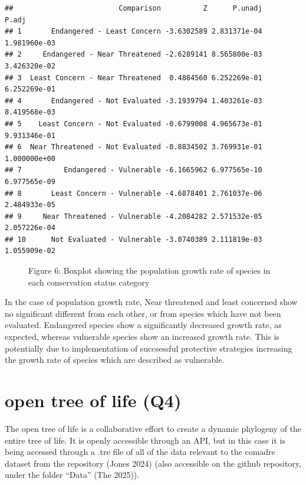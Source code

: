 \documentclass[
]{article}
\begin{document}
\begin{verbatim}
##                         Comparison          Z      P.unadj        P.adj
## 1       Endangered - Least Concern -3.6302589 2.831371e-04 1.981960e-03
## 2     Endangered - Near Threatened -2.6289141 8.565800e-03 3.426320e-02
## 3  Least Concern - Near Threatened  0.4884560 6.252269e-01 6.252269e-01
## 4       Endangered - Not Evaluated -3.1939794 1.403261e-03 8.419568e-03
## 5    Least Concern - Not Evaluated -0.6799008 4.965673e-01 9.931346e-01
## 6  Near Threatened - Not Evaluated -0.8834502 3.769931e-01 1.000000e+00
## 7          Endangered - Vulnerable -6.1665962 6.977565e-10 6.977565e-09
## 8       Least Concern - Vulnerable -4.6878401 2.761037e-06 2.484933e-05
## 9     Near Threatened - Vulnerable -4.2084282 2.571532e-05 2.057226e-04
## 10      Not Evaluated - Vulnerable -3.0740389 2.111819e-03 1.055909e-02
\end{verbatim}

\begin{figure}
\centering

\caption{Figure 6: Boxplot showing the population growth rate of species
in each conservation status category}
\end{figure}

In the case of population growth rate, Near threatened and least
concerned show no significant different from each other, or from species
which have not been evaluated. Endangered species show a significantly
decreased growth rate, as expected, whereas vulnerable species show an
increased growth rate. This is potentially due to implementation of
succsessful protective strategies increasing the growth rate of species
which are described as vulnerable.

\section{open tree of life (Q4)}\label{open-tree-of-life-q4}

The open tree of life is a collaborative effort to create a dynamic
phylogeny of the entire tree of life. It is openly accessible through an
API, but in this case it is being accessed through a .tre file of all of
the data relevant to the comadre dataset from the repository (Jones
2024) (also accessible on the github repository, under the folder
``Data'' (The 2025)).
\end{document}

